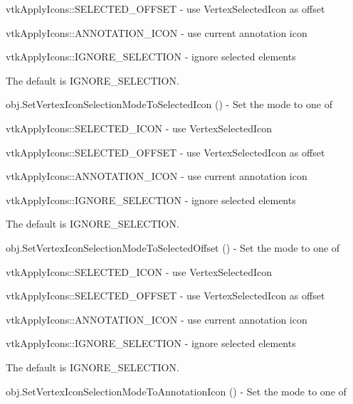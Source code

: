 \begin{DoxyItemize}
\begin{DoxyItemize}
\item vtk\-Apply\-Icons\-::\-S\-E\-L\-E\-C\-T\-E\-D\-\_\-\-O\-F\-F\-S\-E\-T -\/ use Vertex\-Selected\-Icon as offset 
\item vtk\-Apply\-Icons\-::\-A\-N\-N\-O\-T\-A\-T\-I\-O\-N\-\_\-\-I\-C\-O\-N -\/ use current annotation icon 
\item vtk\-Apply\-Icons\-::\-I\-G\-N\-O\-R\-E\-\_\-\-S\-E\-L\-E\-C\-T\-I\-O\-N -\/ ignore selected elements 
\end{DoxyItemize}The default is I\-G\-N\-O\-R\-E\-\_\-\-S\-E\-L\-E\-C\-T\-I\-O\-N.  
\item {\ttfamily obj.\-Set\-Vertex\-Icon\-Selection\-Mode\-To\-Selected\-Icon ()} -\/ Set the mode to one of 
\begin{DoxyItemize}
\item vtk\-Apply\-Icons\-::\-S\-E\-L\-E\-C\-T\-E\-D\-\_\-\-I\-C\-O\-N -\/ use Vertex\-Selected\-Icon 
\item vtk\-Apply\-Icons\-::\-S\-E\-L\-E\-C\-T\-E\-D\-\_\-\-O\-F\-F\-S\-E\-T -\/ use Vertex\-Selected\-Icon as offset 
\item vtk\-Apply\-Icons\-::\-A\-N\-N\-O\-T\-A\-T\-I\-O\-N\-\_\-\-I\-C\-O\-N -\/ use current annotation icon 
\item vtk\-Apply\-Icons\-::\-I\-G\-N\-O\-R\-E\-\_\-\-S\-E\-L\-E\-C\-T\-I\-O\-N -\/ ignore selected elements 
\end{DoxyItemize}The default is I\-G\-N\-O\-R\-E\-\_\-\-S\-E\-L\-E\-C\-T\-I\-O\-N.  
\item {\ttfamily obj.\-Set\-Vertex\-Icon\-Selection\-Mode\-To\-Selected\-Offset ()} -\/ Set the mode to one of 
\begin{DoxyItemize}
\item vtk\-Apply\-Icons\-::\-S\-E\-L\-E\-C\-T\-E\-D\-\_\-\-I\-C\-O\-N -\/ use Vertex\-Selected\-Icon 
\item vtk\-Apply\-Icons\-::\-S\-E\-L\-E\-C\-T\-E\-D\-\_\-\-O\-F\-F\-S\-E\-T -\/ use Vertex\-Selected\-Icon as offset 
\item vtk\-Apply\-Icons\-::\-A\-N\-N\-O\-T\-A\-T\-I\-O\-N\-\_\-\-I\-C\-O\-N -\/ use current annotation icon 
\item vtk\-Apply\-Icons\-::\-I\-G\-N\-O\-R\-E\-\_\-\-S\-E\-L\-E\-C\-T\-I\-O\-N -\/ ignore selected elements 
\end{DoxyItemize}The default is I\-G\-N\-O\-R\-E\-\_\-\-S\-E\-L\-E\-C\-T\-I\-O\-N.  
\item {\ttfamily obj.\-Set\-Vertex\-Icon\-Selection\-Mode\-To\-Annotation\-Icon ()} -\/ Set the mode to one of 

\end{DoxyItemize}
